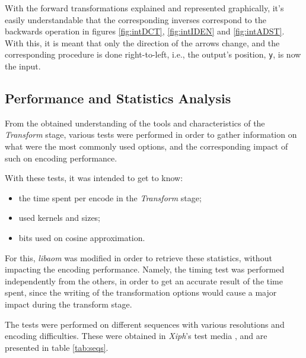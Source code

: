 With the forward transformations explained and represented graphically, it's easily understandable that the corresponding inverses correspond to the backwards operation in figures \ref{fig:intDCT}, \ref{fig:intIDEN} and \ref{fig:intADST}. With this, it is meant that only the direction of the arrows change, and the corresponding procedure is done right-to-left, i.e., the output's position, \texttt{y}, is now the input.

\subsection{Performance and Statistics Analysis}

From the obtained understanding of the tools and characteristics of the \emph{Transform} stage, various tests were performed in order to gather information on what were the most commonly used options, and the corresponding impact of such on encoding performance.

With these tests, it was intended to get to know:
\begin{itemize}
    \item the time spent per encode in the \emph{Transform} stage;
    \item used kernels and sizes;
    \item bits used on cosine approximation.
\end{itemize}

For this, \emph{libaom} was modified in order to retrieve these statistics, without impacting the encoding performance. Namely, the timing test was performed independently from the others, in order to get an accurate result of the time spent, since the writing of the transformation options would cause a major impact during the transform stage.

The tests were performed on different sequences with various resolutions and encoding difficulties. These were obtained in \emph{Xiph}'s test media \cite{XiphOrgTest}, and are presented in table \ref{tab:seqs}.

